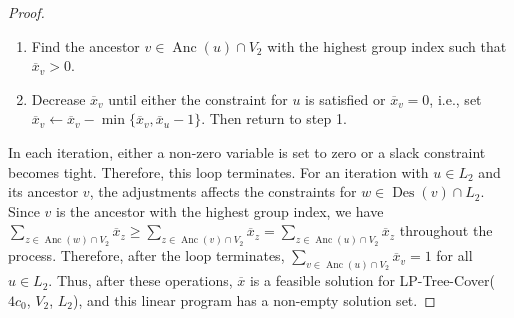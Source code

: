 \documentclass[11pt,a4paper]{article} \usepackage{enumitem}
\newcommand{\Des}{\operatorname{Des}}
\newcommand{\Anc}{\operatorname{Anc}}
\theoremstyle{definition}
\begin{document}
\begin{proof}
\begin{enumerate}
\item Find the ancestor $v \in \Anc(u) \cap V_2$ with the highest group index such that $\overline{x}_v > 0$.

\item Decrease $\overline{x}_v$ until either the constraint for $u$ is satisfied or $\overline{x}_v = 0$, i.e., set $\overline{x}_v \gets \overline{x}_v - \min \{\overline{x}_v, \overline{x}_u - 1\}$. Then return to step 1.
\end{enumerate}

In each iteration, either a non-zero variable is set to zero or a slack constraint becomes tight. Therefore, this loop terminates. For an iteration with $u \in L_2$ and its ancestor $v$, the adjustments affects the constraints for $w \in \Des(v) \cap L_2$. Since $v$ is the ancestor with the highest group index, we have $\sum_{z \in \Anc(w) \cap V_2} \overline{x}_z \geq \sum_{z \in \Anc(v) \cap V_2} \overline{x}_z = \sum_{z \in \Anc(u) \cap V_2} \overline{x}_z$ throughout the process. Therefore, after the loop terminates, $\sum_{v \in \Anc(u) \cap V_2} \overline{x}_v = 1$ for all $u \in L_2$. Thus, after these operations, $\overline{x}$ is a feasible solution for LP-Tree-Cover($4c_0$, $V_2$, $L_2$), and this linear program has a non-empty solution set.
\end{proof}
\end{document}
